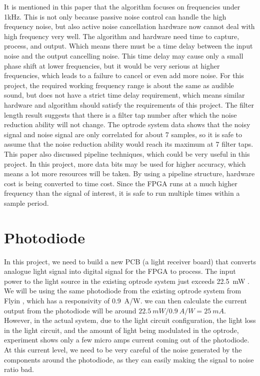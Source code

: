 It is mentioned in this paper that the algorithm focuses on frequencies under 1kHz.  This is not only because passive noise control can handle the high frequency noise, but also active noise cancellation hardware now cannot deal with high frequency very well.  The algorithm and hardware need time to capture, process, and output.  Which means there must be a time delay between the input noise and the output cancelling noise.  This time delay may cause only a small phase shift at lower frequencies, but it would be very serious at higher frequencies, which leads to a failure to cancel or even add more noise.  For this project, the required working frequency range is about the same as audible sound, but does not have a strict time delay requirement, which means similar hardware and algorithm should satisfy the requirements of this project.  The filter length result suggests that there is a filter tap number after which the noise reduction ability will not change.  The optrode system data shows that the noisy signal and noise signal are only correlated for about 7 samples, so it is safe to assume that the noise reduction ability would reach its maximum at 7 filter taps.  This paper also discussed pipeline techniques, which could be very useful in this project.  In this project, more data bits may be used for higher accuracy, which means a lot more resources will be taken.  By using a pipeline structure, hardware cost is being converted to time cost.  Since the FPGA runs at a much higher frequency than the signal of interest, it is safe to run multiple times within a sample period.

\section{Photodiode}

In this project, we need to build a new PCB (a light receiver board) that converts analogue light signal into digital signal for the FPGA to process.  The input power to the light source in the existing optrode system just exceeds \qty{22.5}{mW} \cite{OptrodePower}.  We will be using the same photodiode from the existing optrode system from Flyin \cite{Flyin}, which has a responsivity of \qty{0.9}{A/W}.  we can then calculate the current output from the photodiode will be around $\qty{22.5}{mW}/\qty{0.9}{A/W}=\qty{25}{mA}$.  However, in the actual system, due to the light circuit configuration, the light loss in the light circuit, and the amount of light being modulated in the optrode, experiment shows only a few micro amps current coming out of the photodiode.  At this current level, we need to be very careful of the noise generated by the components around the photodiode, as they can easily making the signal to noise ratio bad.

